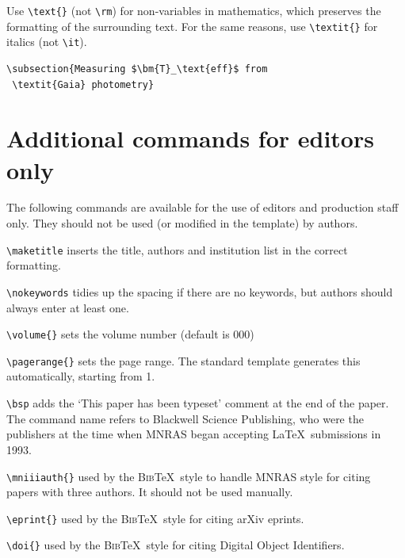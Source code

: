 \documentclass[fleqn,usenatbib,useAMS]{mnras}
\newcommand{\bibtex}{\textsc{Bib}\!\TeX} %
\begin{document}
Use \verb'\text{}' (not \verb'\rm') for non-variables in mathematics, which preserves the formatting of the surrounding text.
For the same reasons, use \verb'\textit{}' for italics (not \verb'\it').
\begin{verbatim}
\subsection{Measuring $\bm{T}_\text{eff}$ from
 \textit{Gaia} photometry}
\end{verbatim}

\section{Additional commands for editors only}
The following commands are available for the use of editors and production staff only.
They should not be used (or modified in the template) by authors.

\begin{description}
 \item \verb'\maketitle' inserts the title, authors and institution list in the correct formatting.
 \item \verb'\nokeywords' tidies up the spacing if there are no keywords, but authors should always enter at least one.
 \item \verb'\volume{}' sets the volume number (default is 000)
 \item \verb'\pagerange{}' sets the page range. The standard template generates this automatically, starting from 1.
 \item \verb'\bsp' adds the `This paper has been typeset\textellipsis' comment at the end of the paper.
The command name refers to Blackwell Science Publishing, who were the publishers at the time when MNRAS began accepting \LaTeX\ submissions in 1993.
 \item \verb'\mniiiauth{}' used by the \bibtex\ style to handle MNRAS style for citing papers with three authors. It should not be used manually.
 \item \verb'\eprint{}' used by the \bibtex\ style for citing arXiv eprints.
 \item \verb'\doi{}' used by the \bibtex\ style for citing Digital Object Identifiers.
\end{description}



\bsp	%
\label{lastpage}
\end{document}
